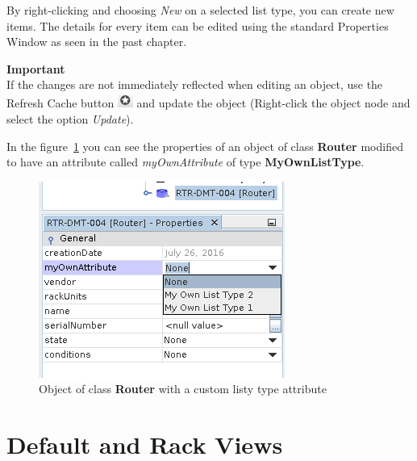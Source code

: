 \documentclass[a4paper]{article}
\begin{document}
	 By right-clicking and choosing \textit{New} on a selected list type, you can create new items. The details for every item can be edited using the standard Properties Window as seen in the past chapter. 
	 \newpage
	 \begin{framed} {\large \textbf{Important}}\\
	 	If the changes are not immediately reflected when editing an object, use the Refresh Cache button  \includegraphics[width=0.5cm]{img/icon_refresh_cache.png} and update the object (Right-click the object node and select the option \textit{Update}).
	 \end{framed}
	 
	 In the figure~\ref{fig:list_type_applied_types} you can see the properties of an object of class \textbf{Router} modified to have an attribute called \textit{myOwnAttribute} of type \textbf{MyOwnListType}.\newline
	 \begin{figure}[h!]
	 	\centering
	 	\includegraphics[width=0.4\linewidth]{img/list_type_applied_types.png}
	 	\caption{Object of class \textbf{Router} with a custom listy type attribute}
	 	\label{fig:list_type_applied_types}
	 \end{figure}
	 
	\newpage
	\section{Default and Rack Views}
\end{document}
